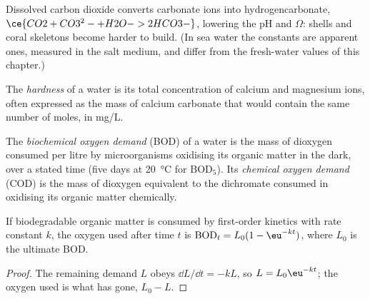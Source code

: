 Dissolved carbon dioxide converts carbonate ions into hydrogencarbonate, $\ce{CO2 + CO3^2- + H2O -> 2HCO3-}$,
lowering the pH and $\Omega$: shells and coral skeletons become harder to build. (In
sea water the constants are apparent ones, measured in the salt medium, and
differ from the fresh-water values of this chapter.)

\begin{definition}\label{def:b3:environmental-toxicology:hardness}
The \emph{hardness} of a water is its total concentration
of calcium and magnesium ions, often expressed as the mass of calcium carbonate
that would contain the same number of moles, in mg/L.
\end{definition}

\begin{definition}\label{def:b3:environmental-toxicology:oxygen-demand}
The \emph{biochemical oxygen demand} (BOD) of a
water is the mass of dioxygen consumed per litre by microorganisms oxidising its
organic matter in the dark, over a stated time (five days at \qty{20}{\celsius} for $\mathrm{BOD_5}$). Its
\emph{chemical oxygen demand} (COD) is the mass of
dioxygen equivalent to the dichromate consumed in oxidising its organic matter
chemically.
\end{definition}

\begin{proposition}\label{prop:b3:environmental-toxicology:bod}
If biodegradable organic matter is consumed by first-order kinetics with rate
constant $k$, the oxygen used after time $t$ is $\mathrm{BOD}_t = L_0(1 - \eu^{-kt})$, where $L_0$ is the ultimate BOD.
\end{proposition}

\begin{proof}
The remaining demand $L$ obeys $\dd L/\dd t = -kL$, so $L = L_0\eu^{-kt}$; the oxygen used is what has gone,
$L_0 - L$.
\end{proof}

